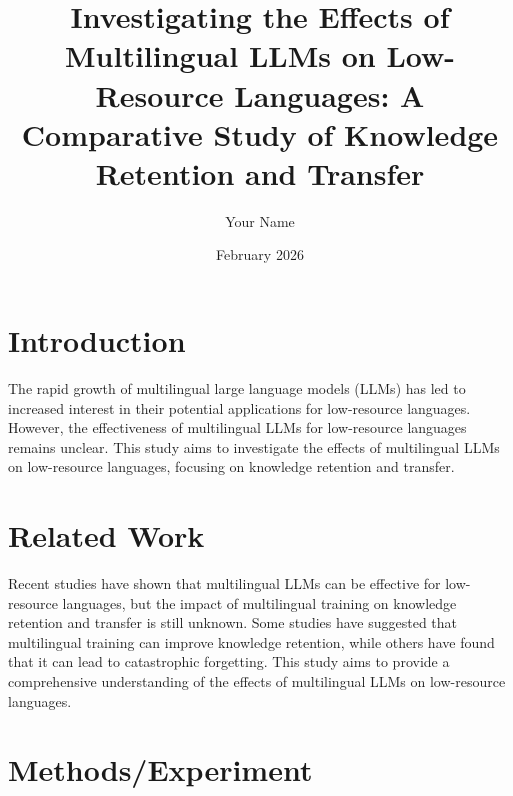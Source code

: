 \documentclass{article}
\begin{document}
\title{Investigating the Effects of Multilingual LLMs on Low-Resource Languages: A Comparative Study of Knowledge Retention and Transfer}

\author{Your Name}

\date{February 2026}

\maketitle


\section{Introduction}

The rapid growth of multilingual large language models (LLMs) has led to increased interest in their potential applications for low-resource languages. However, the effectiveness of multilingual LLMs for low-resource languages remains unclear. This study aims to investigate the effects of multilingual LLMs on low-resource languages, focusing on knowledge retention and transfer.

\section{Related Work}

Recent studies have shown that multilingual LLMs can be effective for low-resource languages, but the impact of multilingual training on knowledge retention and transfer is still unknown. Some studies have suggested that multilingual training can improve knowledge retention, while others have found that it can lead to catastrophic forgetting. This study aims to provide a comprehensive understanding of the effects of multilingual LLMs on low-resource languages.

\section{Methods/Experiment}
\end{document}
